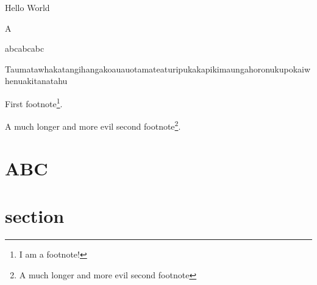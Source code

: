 \documentclass{article}
\newcommand{\A}{abc}
\begin{document}
Hello World

A

\A abc\A

Taumatawhakatangihangakoauauotamateaturipukakapikimaungahoronukupokaiwhenuakitanatahu

First footnote\footnote{I am a footnote!}.

A much longer and more evil second footnote\footnote{A much longer and more evil second footnote}.

\section{ABC}

\section{section}
\end{document}
